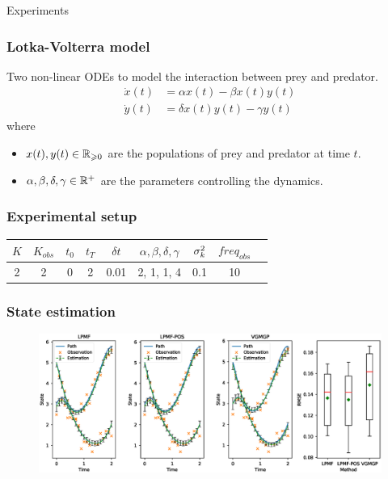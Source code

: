 \begin{frame}
    \begin{center}
        {\large Experiments}
    \end{center}        
\end{frame}

\begin{frame}[t]
    \frametitle{Lotka-Volterra model}
    Two non-linear ODEs to model the interaction between prey and predator.
    \begin{align}
        \dot{x}(t) & = \alpha x(t) - \beta x(t)y(t)
        \nonumber
        \\
        \dot{y}(t) & = \delta x(t)y(t) - \gamma y(t)
        \label{eq-lotka-odes}
    \end{align}
    where 
    \begin{itemize}
        \item[] $x(t), y(t) \in \mathbb{R}_{\geqslant 0}$ are the populations of prey and predator at time $t$.    
        \item[] $\alpha, \beta, \delta, \gamma \in \mathbb{R}^+$ are the parameters controlling the dynamics.
    \end{itemize}
\end{frame}

\begin{frame}[t]
    \frametitle{Experimental setup}
    \begin{table}
        \centering
        \label{table-lotka-setup}
        \begin{tabular}{|c|c|c|c|c|c|c|c|c|}
            \hline
            $K$ & $K_{obs}$ & $t_0$ & $t_T$ & $\delta t$ & $\alpha, \beta, \delta, \gamma$ & $\sigma_{k}^2$  & $freq_{obs}$ \\ \hline
        2 & 2 & 0 & 2 & 0.01 & 2, 1, 1, 4 & 0.1 & 10 \\ \hline
        \end{tabular}
    \end{table}
\end{frame}

\begin{frame}[t]
    \frametitle{State estimation}
    \begin{figure}
        \centering
        \includegraphics[width=\textwidth]{graphics/lotka-states}
        \label{fig-lotka-state}
    \end{figure}
\end{frame}

